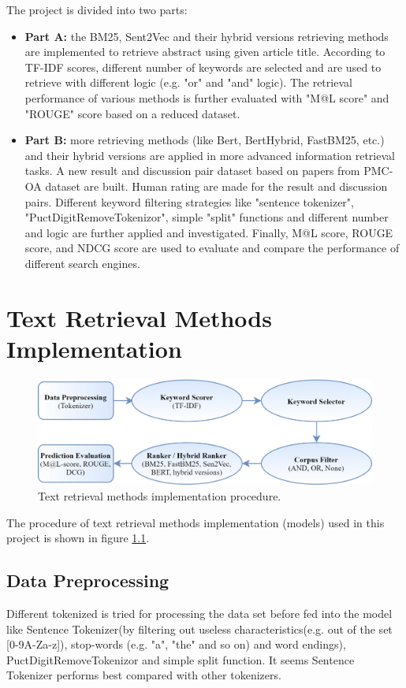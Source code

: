 The project is divided into two parts:
\begin{itemize}
	\item \textbf{Part A:} the BM25, Sent2Vec and their hybrid versions retrieving methods are implemented to retrieve abstract using given article title. According to TF-IDF scores, different number of keywords are selected and are used to retrieve with different logic (e.g. "or" and "and" logic).
	The retrieval performance of various methods is further evaluated with "M@L score" and "ROUGE" score based on a reduced dataset.
	
	\item \textbf{Part B:} more retrieving methods (like Bert, BertHybrid, FastBM25, etc.) and their hybrid versions are applied in more advanced information retrieval tasks.
	A new result and discussion pair dataset based on papers from PMC-OA dataset are built.
	Human rating are made for the result and discussion pairs. Different keyword filtering strategies like "sentence tokenizer", "PuctDigitRemoveTokenizor", simple "split" functions and different number and logic are further applied and investigated.
	Finally, M@L score, ROUGE score, and NDCG score are used to evaluate and compare the performance of different search engines. 
\end{itemize}


\chapter{Text Retrieval Methods Implementation}			

\begin{figure}[htbp]
	\centering
	\includegraphics[width=\textwidth]{figure/Implementation procedure.png}			
	\caption[]{Text retrieval methods implementation procedure.}
	\label{fig: implementation_procedure}
\end{figure}

The procedure of text retrieval methods implementation (models) used in this project is shown in figure \ref{fig: implementation_procedure}.

\section{Data Preprocessing}
Different tokenized is tried for processing the data set before fed into the model like Sentence Tokenizer(by filtering out useless characteristics(e.g. out of the set [0-9A-Za-z]), stop-words (e.g.  "a", "the" and so on) and word endings), PuctDigitRemoveTokenizor and simple split function.
It seems Sentence Tokenizer performs best compared with other tokenizers.

